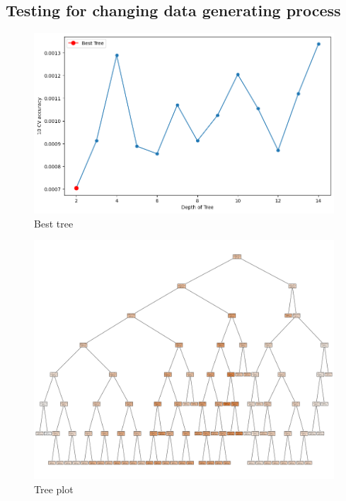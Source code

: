 \documentclass[10pt,leqno]{article}
\begin{document}
\pagebreak
\subsection{Testing for changing data generating process}
\begin{figure}  [h!]
\begin{center}
\caption{Best tree}
\includegraphics[scale=0.4]{BestTree_RF3.png}
\end{center}
\end{figure}  

\begin{figure}  [h!]
\begin{center}
\caption{Tree plot}
\includegraphics[scale=0.3]{TreePlot_RF3.png}
\end{center}
\end{figure}  
\end{document}
